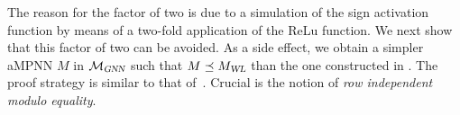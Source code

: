 The reason for the factor of two  is due to a simulation of the sign activation function by means of a two-fold application of the ReLu function. We next show that this factor of two can be avoided. As a side effect, we obtain a simpler aMPNN $M$ in $\mathcal{M}_{\textsl{GNN}}$ such that $M\preceq M_{\textsl{WL}}$ than the one constructed in \cite{grohewl}. The proof strategy is similar to that of~\cite{grohewl}.
Crucial is the notion of \textit{row independent modulo equality}.

